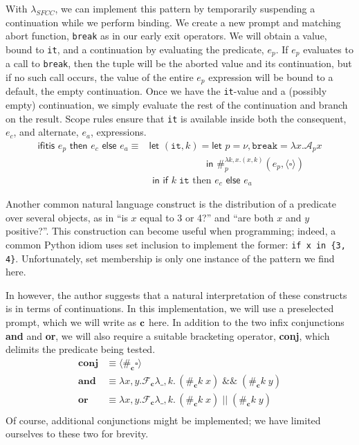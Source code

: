 \documentclass[11pt]{article}
\newcommand\x{\lambda x}
\newcommand{\letin}[2]{\textsf{let }#1\textsf{ in }#2}
\newcommand\F{\mathcal{F}}
\newcommand\A{\mathcal{A}}
\newcommand{\angles}[1]{\langle#1\rangle}
\begin{document}
With $\lambda_{SFCC}$, we can implement this pattern by temporarily suspending a continuation while we perform binding.
We create a new prompt and matching abort function, \texttt{break} as in our early exit operators.
We will obtain a value, bound to \texttt{it}, and a continuation by evaluating the predicate, $e_p$.
If $e_p$ evaluates to a call to \texttt{break}, then the tuple will be the aborted value and its continuation, but if no such call occurs, the value of the entire $e_p$ expression will be bound to a default, the empty continuation.
Once we have the \texttt{it}-value and a (possibly empty) continuation, we simply evaluate the rest of the continuation and branch on the result.
Scope rules ensure that \texttt{it} is available inside both the consequent, $e_c$, and alternate, $e_a$, expressions.
\begin{align*}
\textsf{ifitis }e_p\textsf{ then }e_c\textsf{ else }e_a \equiv{}
	&\letin{(\texttt{it}, k) = \letin{p = \nu, \texttt{break} = \x.\A_px
	\\&\qquad\qquad\quad\;\;}{\#_p^{\lambda k,x.(x,k)}(e_p, \angles{\square})}
	\\&}{\textsf{if }k\;\texttt{it}\text{ then }e_c\textsf{ else }e_a}
\end{align*}

Another common natural language construct is the distribution of a predicate over several objects, as in ``is $x$ equal to 3 or 4?'' and ``are both $x$ and $y$ positive?''.
This construction can become useful when programming;
indeed, a common Python idiom uses set inclusion to implement the former: \texttt{if x in \{3, 4\}}.
Unfortunately, set membership is only one instance of the pattern we find here.

In \cite{ContInNatlang} however, the author suggests that a natural interpretation of these constructs is in terms of continuations.
In this implementation, we will use a preselected prompt, which we will write as $\textbf c$ here.
In addition to the two infix conjunctions \textbf{and} and \textbf{or}, we will also require a suitable bracketing operator, \textbf{conj}, which delimits the predicate being tested.
\begin{align*}
\textbf{conj} &\equiv \angles{\#_\textbf{c}\square} \\
\textbf{and} &\equiv \x,y. \F_\textbf{c}\lambda \_, k.\,(\#_\textbf{c}k\;x)\;\&\&\;(\#_\textbf{c}k\;y) \\
\textbf{or} &\equiv \x,y. \F_\textbf{c}\lambda \_, k.\,(\#_\textbf{c}k\;x)\;||\;(\#_\textbf{c}k\;y) \\
\end{align*}
Of course, additional conjunctions might be implemented; we have limited ourselves to these two for brevity.
\end{document}
